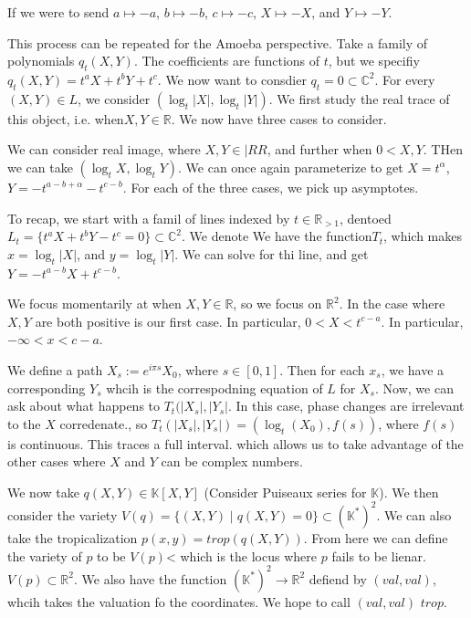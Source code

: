 \documentclass[11pt]{article}
\theoremstyle{definition}
\theoremstyle{plain}%
\theoremstyle{definition}
\def\RR{{\mathbb R}}
\def\KK{{\mathbb K}}
\def\CC{{\mathbb C}}
\begin{document}
If we were to send $a \mapsto -a$, $b \mapsto -b$, $c \mapsto -c$, $X \mapsto -X$, and $Y \mapsto -Y$.


This process can be repeated for the Amoeba perspective. Take a family of polynomials $q_t(X,Y)$. The coefficients are functions of $t$, but we specifiy $q_t(X,Y) = t^aX + t^bY+t^c$. We now want to consdier $q_t = 0 \subset \CC^2$. For every $(X,Y) \in L$, we consider $(\log_t|X|,\log_t|Y|)$. We first study the real trace of this object, i.e. when$ X,Y \in \RR$. We now have three cases to consider. 


We can consider real image, where $X,Y \in |RR$, and further when $0< X,Y$. THen we can take $(\log_tX,\log_tY)$. We can once again parameterize to get $X= t^\alpha$, $Y = -t^{a-b+\alpha} -t^{c-b}$.  For each of the three cases, we pick up asymptotes.







To recap, we start with a famil of lines indexed by $t \in \RR_{>1}$, dentoed $L_t= \{t^aX + t^bY -t^c=0\} \subset \CC^2$. We denote We have the function$ T_t$, which makes $x= \log_t|X|$, and $y=\log_t|Y|$. We can solve for thi line, and get $Y= -t^{a-b}X + t^{c-b}$.


We focus momentarily at when $X,Y \in \RR$, so we focus on $\RR^2$. In the case where $X,Y$ are both positive is our first case. In particular, $0<X<t^{c-a}$. In particular, $-\infty<x<c-a$.


We define a path $X_s :=e^{i\pi s}X_0$, where $s \in [0,1]$. Then for each $x_s$, we have a corresponding $Y_s$ whcih is the correspodning equation of $L$ for $X_s$. Now, we can ask about what happens to $T_t(|X_s|, |Y_s|$. In this case, phase changes are irrelevant to the $X$ corredenate., so $T_t(|X_s|,|Y_s|)= (\log_t(X_0), f(s))$, where $f(s)$ is continuous. This traces a full interval. which allows us to take advantage of the other cases where $X$ and $Y$ can be complex numbers.





We now take $q(X,Y)\in \KK[X,Y]$ (Consider Puiseaux series for $\KK$). We then consider the variety $V(q) = \{(X,Y) \; |\; q(X,Y) = 0 \} \subset (\KK^*)^2$. We can also take the tropicalization $p(x,y) = trop(q(X,Y))$. From here we can define the variety of $p$ to be $V(p)$< which is the locus where $p$ fails to be lienar. $V(p) \subset \RR^2$. We also have the function $(\KK^*)^2 \rightarrow \RR^2$ defiend by $(val, val)$, whcih takes the valuation fo the coordinates. We hope to call $(val, val)$ $trop$. 
\end{document}
